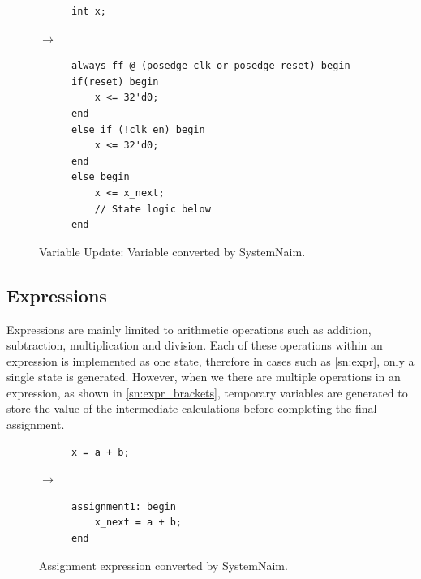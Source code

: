 \begin{figure}[H]
\centering
\begin{subfigure}{0.15\textwidth}
    \centering
    \begin{verbatim}
int x;
    \end{verbatim}
\end{subfigure}%
{\LARGE$\rightarrow$}%
\begin{subfigure}{0.45\textwidth}
    \begin{verbatim}
always_ff @ (posedge clk or posedge reset) begin
if(reset) begin
    x <= 32'd0;
end
else if (!clk_en) begin
    x <= 32'd0;
end
else begin
    x <= x_next;
    // State logic below
end
    \end{verbatim}
\end{subfigure}
\caption{Variable Update: Variable converted by SystemNaim.}
\label{sn:var_update}
\end{figure}

\subsection{Expressions}

Expressions are mainly limited to arithmetic operations such as addition, subtraction, multiplication and division. Each of these operations within an expression is implemented as one state, therefore in cases such as \autoref{sn:expr}, only a single state is generated. However, when we there are multiple operations in an expression, as shown in \autoref{sn:expr_brackets}, temporary variables are generated to store the value of the intermediate calculations before completing the final assignment.

\begin{figure}[H]
\centering
\begin{subfigure}{0.2\textwidth}
    \centering
    \begin{verbatim}
x = a + b;
    \end{verbatim}
\end{subfigure}%
{\LARGE$\rightarrow$}%
\begin{subfigure}{0.3\textwidth}
    \begin{verbatim}
assignment1: begin
    x_next = a + b;
end
    \end{verbatim}
\end{subfigure}
\caption{Assignment expression converted by SystemNaim.}
\label{sn:expr}
\end{figure}

